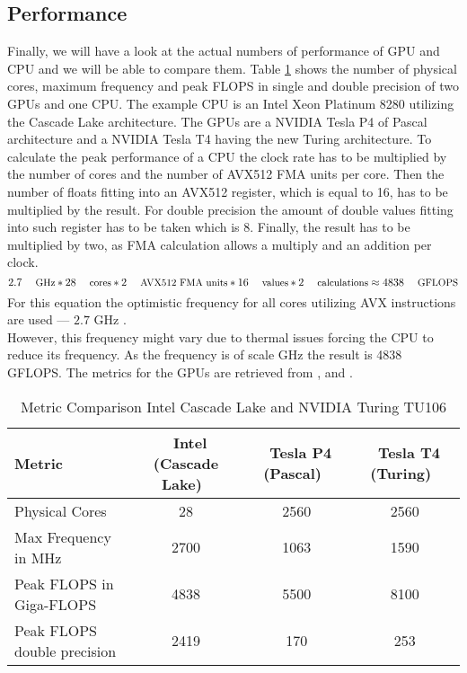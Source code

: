 \subsection{Performance}
  Finally, we will have a look at the actual numbers of performance of GPU and CPU and we will be able to compare them.
  Table \ref{tab:comp} shows the number of physical cores, maximum frequency and peak FLOPS in single and double precision of two GPUs and one CPU.
  The example CPU is an Intel Xeon Platinum 8280 utilizing the Cascade Lake architecture.
  The GPUs are a NVIDIA Tesla P4 of Pascal architecture and a NVIDIA Tesla T4 having the new Turing architecture.
  To calculate the peak performance of a CPU the clock rate has to be multiplied by the number of cores and the number of AVX512 FMA units per core.
  Then the number of floats fitting into an AVX512 register, which is equal to 16, has to be multiplied by the result.
  For double precision the amount of double values fitting into such register has to be taken which is 8.
  Finally, the result has to be multiplied by two, as FMA calculation allows a multiply and an addition per clock.
  \[2.7 \textrm{\small{ GHz}} * 28 \textrm{\small{ cores}} * 2 \textrm{\small{ AVX512 FMA units}} * 16 \textrm{\small{ values}} * 2 \textrm{\small{ calculations}} \approx 4838 \textrm{\small{ GFLOPS}}\]
  For this equation the optimistic frequency for all cores utilizing AVX instructions are used --- \(2.7\) GHz \cite{Microway}.\\
  However, this frequency might vary due to thermal issues forcing the CPU to reduce its frequency.
  As the frequency is of scale GHz the result is 4838 GFLOPS.
  The metrics for the GPUs are retrieved from \cite{NVIDIA.2018}, \cite{Keny2019} and \cite{GPZOO}.
  
\begin{table}[htbp]
  \centering
  \caption{Metric Comparison Intel Cascade Lake and NVIDIA Turing TU106}
  \label{tab:comp}
  \begin{tabular}{|l|c|c|c|}
    \hline
	\textbf{Metric} & \textbf{~Intel (Cascade Lake)~} & \textbf{~Tesla P4 (Pascal)~} & \textbf{~Tesla T4 (Turing)~} \\\hline
	Physical Cores & 28 & 2560 & 2560 \\\hline
	Max Frequency in MHz & 2700 & 1063 & 1590 \\\hline
	Peak FLOPS in Giga-FLOPS & 4838 & 5500 & 8100 \\\hline
	Peak FLOPS double precision & 2419 & 170 & 253 \\\hline
  \end{tabular}
\end{table}

